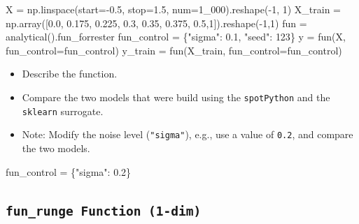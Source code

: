 \documentclass[
  letterpaper,
  DIV=11,
  numbers=noendperiod]{scrreprt}
\newenvironment{Shaded}{\begin{snugshade}}{\end{snugshade}}
\newcommand{\DecValTok}[1]{\textcolor[rgb]{0.68,0.00,0.00}{#1}}
\newcommand{\FloatTok}[1]{\textcolor[rgb]{0.68,0.00,0.00}{#1}}
\newcommand{\NormalTok}[1]{\textcolor[rgb]{0.00,0.23,0.31}{#1}}
\newcommand{\OperatorTok}[1]{\textcolor[rgb]{0.37,0.37,0.37}{#1}}
\newcommand{\StringTok}[1]{\textcolor[rgb]{0.13,0.47,0.30}{#1}}
\providecommand{\tightlist}{%
  \setlength{\itemsep}{0pt}\setlength{\parskip}{0pt}}\usepackage{longtable,booktabs,array}
\begin{document}
\begin{Shaded}
\begin{Highlighting}[]
\NormalTok{X }\OperatorTok{=}\NormalTok{ np.linspace(start}\OperatorTok{={-}}\FloatTok{0.5}\NormalTok{, stop}\OperatorTok{=}\FloatTok{1.5}\NormalTok{, num}\OperatorTok{=}\DecValTok{1\_000}\NormalTok{).reshape(}\OperatorTok{{-}}\DecValTok{1}\NormalTok{, }\DecValTok{1}\NormalTok{)}
\NormalTok{X\_train }\OperatorTok{=}\NormalTok{ np.array([}\FloatTok{0.0}\NormalTok{, }\FloatTok{0.175}\NormalTok{, }\FloatTok{0.225}\NormalTok{, }\FloatTok{0.3}\NormalTok{, }\FloatTok{0.35}\NormalTok{, }\FloatTok{0.375}\NormalTok{, }\FloatTok{0.5}\NormalTok{,}\DecValTok{1}\NormalTok{]).reshape(}\OperatorTok{{-}}\DecValTok{1}\NormalTok{,}\DecValTok{1}\NormalTok{)}
\NormalTok{fun }\OperatorTok{=}\NormalTok{ analytical().fun\_forrester}
\NormalTok{fun\_control }\OperatorTok{=}\NormalTok{ \{}\StringTok{"sigma"}\NormalTok{: }\FloatTok{0.1}\NormalTok{,}
               \StringTok{"seed"}\NormalTok{: }\DecValTok{123}\NormalTok{\}}
\NormalTok{y }\OperatorTok{=}\NormalTok{ fun(X, fun\_control}\OperatorTok{=}\NormalTok{fun\_control)}
\NormalTok{y\_train }\OperatorTok{=}\NormalTok{ fun(X\_train, fun\_control}\OperatorTok{=}\NormalTok{fun\_control)}
\end{Highlighting}
\end{Shaded}

\begin{itemize}
\tightlist
\item
  Describe the function.
\item
  Compare the two models that were build using the \texttt{spotPython}
  and the \texttt{sklearn} surrogate.
\item
  Note: Modify the noise level (\texttt{"sigma"}), e.g., use a value of
  \texttt{0.2}, and compare the two models.
\end{itemize}

\begin{Shaded}
\begin{Highlighting}[]
\NormalTok{fun\_control }\OperatorTok{=}\NormalTok{ \{}\StringTok{"sigma"}\NormalTok{: }\FloatTok{0.2}\NormalTok{\}}
\end{Highlighting}
\end{Shaded}

\hypertarget{fun_runge-function-1-dim}{%
\subsection{\texorpdfstring{\texttt{fun\_runge\ Function\ (1-dim)}}{fun\_runge Function (1-dim)}}\label{fun_runge-function-1-dim}}
\end{document}
